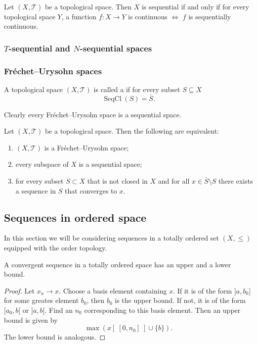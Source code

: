 \begin{proposition}
Let $(X,\mathcal{T})$ be a topological space. Then $X$ is sequential \textup{if and only if} for every topological space $Y$, a function $f:X\to Y$ is continuous $\Leftrightarrow$ $f$ is sequentially continuous.
\end{proposition}


\subsubsection{$T$-sequential and $N$-sequential spaces}

\subsubsection{Fréchet–Urysohn spaces}
\begin{definition}
A topological space $(X,\mathcal{T})$ is called a  if for every subset $S\subseteq X$
\[ \operatorname{SeqCl}(S) = \bar{S}. \]
\end{definition}
Clearly every Fréchet–Urysohn space is a sequential space.

\begin{proposition} \label{FrechetUrysohn}
Let $(X,\mathcal{T})$ be a topological space. Then the following are equivalent:
\begin{enumerate}
\item $(X,\mathcal{T})$ is a Fréchet–Urysohn space;
\item every subspace of $X$ is a sequential space;
\item for every subset $S\subset X$ that is not closed in $X$ and for all $x\in \bar{S}\setminus S$ there exists a sequence in $S$ that converges to $x$.
\end{enumerate}
\end{proposition}

\subsection{Sequences in ordered space}
In this section we will be considering sequences in a totally ordered set $(X,\leq)$ equipped with the order topology.

\begin{lemma} \label{convergentSequenceIsBounded}
A convergent sequence in a totally ordered space has an upper and a lower bound.
\end{lemma}
\begin{proof}
Let $x_n\to x$. Choose a basis element containing $x$. If it is of the form $]a,b_0]$ for some greates element $b_0$, then $b_0$ is the upper bound. If not, it is of the form $[a_0,b[$ or $]a,b[$. Find an $n_0$ corresponding to this basis element. Then an upper bound is given by
\[ \max(x[\;[0,n_0]\;]\cup\{b\}). \]
The lower bound is analogous.
\end{proof}

